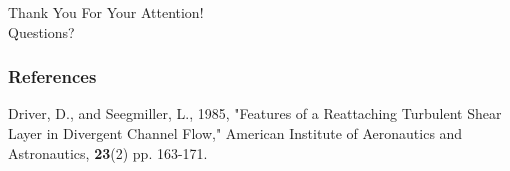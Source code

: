 \documentclass{beamer}
\begin{document}
%
%
%
%
%
%




\begin{frame}
\begin{center}
{\huge Thank You For Your Attention!} \\
\vspace*{1.5cm}
{\Large Questions?}
\end{center}

\end{frame}



\appendix
{}
\setcounter{finalframe}{\value{framenumber}}

\begin{frame}[allowframebreaks] 
\frametitle{References}
\begin{thebibliography}{1} %
\begin{tiny}
\beamertemplatetextbibitems

Driver, D., and Seegmiller, L., 1985, "Features of a Reattaching Turbulent Shear Layer in Divergent Channel Flow," American Institute of Aeronautics and Astronautics, \textbf{23}(2) pp. 163-171.

\end{tiny}
\end{thebibliography}
\end{frame}
\end{document}
